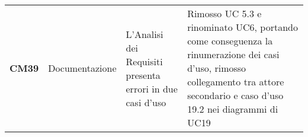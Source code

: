 \documentclass[../piano-di-qualifica.tex]{subfiles}
\begin{document}
\begin{longtable}[H]{>{\centering\bfseries}m{2.5cm} >{\centering}m{2.5cm} >{\centering}m{5.5cm} >{\centering\arraybackslash}m{5.5cm}}
CM39 & Documentazione                                & L’Analisi dei Requisiti presenta errori in due casi d’uso                                                                                                                     & Rimosso UC 5.3 e rinominato UC6, portando come conseguenza la rinumerazione dei casi d’uso, rimosso collegamento tra attore secondario e caso d’uso 19.2 nei diagrammi di UC19                                                                                                                                                                     \\

\end{longtable}
\end{document}
